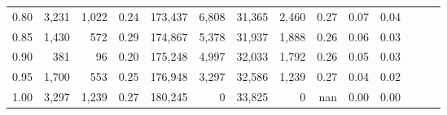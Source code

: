 \begin{tabular}{rrrrrrrrrrrrrr}
0.80 &   3,231 &  1,022 &  0.24 &  173,437 &    6,808 &  31,365 &   2,460 &  0.27 &  0.07 &      0.04 \\
0.85 &   1,430 &    572 &  0.29 &  174,867 &    5,378 &  31,937 &   1,888 &  0.26 &  0.06 &      0.03 \\
0.90 &     381 &     96 &  0.20 &  175,248 &    4,997 &  32,033 &   1,792 &  0.26 &  0.05 &      0.03 \\
0.95 &   1,700 &    553 &  0.25 &  176,948 &    3,297 &  32,586 &   1,239 &  0.27 &  0.04 &      0.02 \\
1.00 &   3,297 &  1,239 &  0.27 &  180,245 &        0 &  33,825 &       0 &   nan &  0.00 &      0.00 \\
\bottomrule
\end{tabular}
